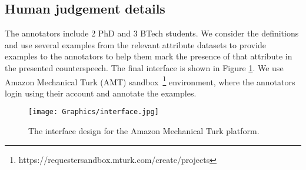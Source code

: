 \newpage

\subsection{Human judgement details}
The annotators include 2 PhD and 3 BTech students. We consider the definitions and use several examples from the relevant attribute datasets to provide examples to the annotators to help them mark the presence of that attribute in the presented counterspeech. The final interface is shown in Figure \ref{fig:interface}. We use  Amazon Mechanical Turk (AMT) sandbox~\footnote{https://requestersandbox.mturk.com/create/projects} environment, where the annotators login using their account and annotate the examples.


\begin{figure}[!b]
    \centering
    \texttt{[image: Graphics/interface.jpg]}
    \caption{The interface design for the Amazon Mechanical Turk platform.}
    \label{fig:interface}
\end{figure}




